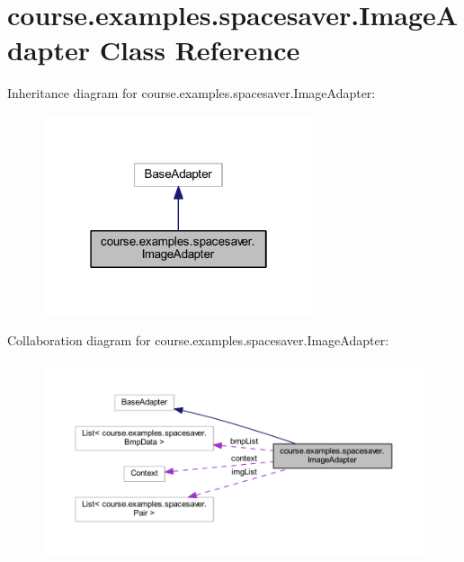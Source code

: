 \hypertarget{classcourse_1_1examples_1_1spacesaver_1_1_image_adapter}{}\section{course.\+examples.\+spacesaver.\+Image\+Adapter Class Reference}
\label{classcourse_1_1examples_1_1spacesaver_1_1_image_adapter}


Inheritance diagram for course.\+examples.\+spacesaver.\+Image\+Adapter\+:
\nopagebreak
\begin{figure}[H]
\begin{center}
\leavevmode
\includegraphics[width=226pt]{classcourse_1_1examples_1_1spacesaver_1_1_image_adapter__inherit__graph}
\end{center}
\end{figure}


Collaboration diagram for course.\+examples.\+spacesaver.\+Image\+Adapter\+:
\nopagebreak
\begin{figure}[H]
\begin{center}
\leavevmode
\includegraphics[width=350pt]{classcourse_1_1examples_1_1spacesaver_1_1_image_adapter__coll__graph}
\end{center}
\end{figure}
